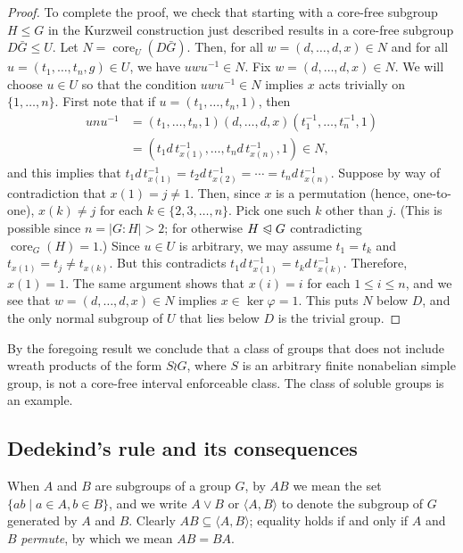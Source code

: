 \documentclass{gen-j-l}
\newcommand{\<}{\ensuremath{\langle}}
\renewcommand{\>}{\ensuremath{\rangle}}
\theoremstyle{plain}
\theoremstyle{definition}
\theoremstyle{remark}
\numberwithin{theorem}{section}
\numberwithin{claim}{section}
\numberwithin{equation}{section}
\numberwithin{conjecture}{section}
\renewcommand{\leq}{\ensuremath{\leqslant}}
\newcommand{\subnormal}{\ensuremath{\trianglelefteqslant}}
\newcommand{\join}{\ensuremath{\vee}}
\newcommand{\core}{\ensuremath{\operatorname{core}}}
\newcommand{\2}{\ensuremath{\mathbf{2}}}
\newcommand{\3}{\ensuremath{\mathbf{3}}}
\renewcommand{\phi}{\ensuremath{\varphi}}
\begin{document}
\begin{proof}
  To complete the proof, we check that starting with a core-free subgroup
  $H \leq G$ in the Kurzweil construction just described results in a
  core-free subgroup $D \bar{G} \leq U$.   Let $N = \core_U(D\bar{G})$.  Then, for all $w=(d,\dots, d, x) \in N$ and for all 
  $u = (t_1,\dots, t_n, g)\in U$, we have $u w u^{-1}\in N$. 
  Fix $w=(d,\dots, d, x) \in N$.  We will choose $u\in U$ so that
  the condition $u w u^{-1}\in N$ implies $x$ acts trivially on $\{1, \dots, n\}$.
  First note that if $u = (t_1,\dots, t_n, 1)$, then
  \begin{align*}
  u n u^{-1} &= (t_1,\dots, t_n, 1) (d, \dots, d, x) (t_1^{-1},\dots, t_n^{-1}, 1)\\
  &=(t_1 d \,t_{x(1)}^{-1},\dots, t_nd \,t_{x(n)}^{-1}, 1) \in N,
  \end{align*}
  and this implies that $t_1 d\, t_{x(1)}^{-1} = t_2 d\, t_{x(2)}^{-1} =\cdots = t_nd \,t_{x(n)}^{-1}$. 
  Suppose by way of contradiction that $x(1) = j\neq 1$.  Then, since $x$ is a
  permutation (hence, one-to-one), $x(k) \neq j$ for
  each $k\in \{2, 3, \dots, n\}$.  Pick one such $k$ other than $j$.
  (This is possible since $n = |G:H|>2$; for otherwise $H\subnormal G$
  contradicting $\core_G(H)=1$.) 
  Since $u \in U$ is arbitrary, we may assume
  $t_1 = t_k$ and $t_{x(1)}=t_j\neq t_{x(k)}$.  
  But this contradicts $t_1 d\, t_{x(1)}^{-1} = t_k d\, t_{x(k)}^{-1}$.
  Therefore, $x(1) = 1$.  The same argument shows that 
  $x(i) = i$ for each $1\leq i\leq n$, 
  and we see that
  $w=(d,\dots,d, x) \in N$ implies $x\in \ker \phi = 1$.  This puts $N$ below
  $D$, and the only normal subgroup of $U$ that lies 
  below $D$ is the trivial group.
\end{proof}
By the foregoing result we conclude that a class of groups that does
not include wreath products of the form $S\wr G$, where $S$ is an arbitrary
finite nonabelian simple group, is not a core-free interval enforceable class. 
The class of soluble groups is an example.




\subsection{Dedekind's rule and its consequences}
\label{sec:dedekinds-rule}
When $A$ and $B$ are subgroups of a group $G$, by $AB$ we mean the set
$\{ a b \mid a\in A, b\in B\}$, and we write $A \join B$ or $\<A, B\>$ to denote
the subgroup of $G$ generated by $A$ and $B$.  
Clearly $AB \subseteq \<A,B\>$; 
equality holds if and only if $A$ and $B$ \emph{permute}, by which we mean $A B = B A$.
\end{document}
